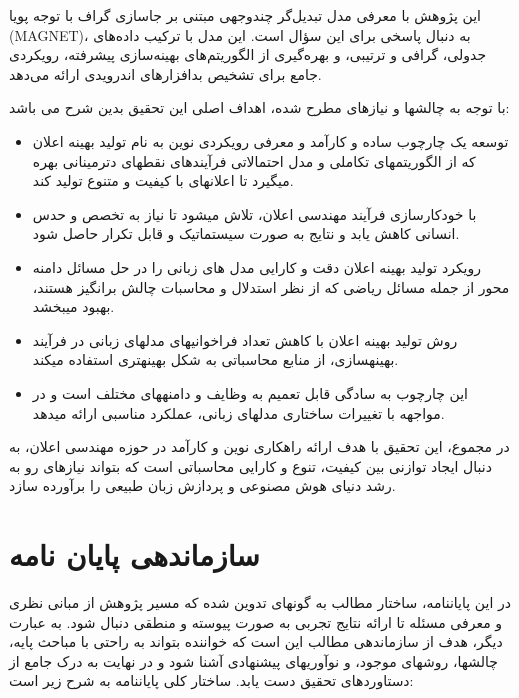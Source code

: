 این پژوهش با معرفی مدل تبدیل‌گر چندوجهی مبتنی بر جاسازی گراف با توجه پویا (MAGNET)، به دنبال پاسخی برای این سؤال است. این مدل با ترکیب داده‌های جدولی، گرافی و ترتیبی، و بهره‌گیری از الگوریتم‌های بهینه‌سازی پیشرفته، رویکردی جامع برای تشخیص بدافزارهای اندرویدی ارائه می‌دهد.

با توجه به چالش\/ها و نیازهای مطرح شده، اهداف اصلی این تحقیق بدین شرح می باشد:
\begin{itemize}
	\item توسعه یک چارچوب ساده و کارآمد و معرفی رویکردی نوین به نام تولید بهینه اعلان
	 که از الگوریتم\/های تکاملی و مدل احتمالاتی فرآیندهای نقطه\/ای دترمینانی بهره می\/گیرد تا اعلان\/های با کیفیت و متنوع تولید کند.
	\item با خودکارسازی فرآیند مهندسی اعلان، تلاش می\/شود تا نیاز به تخصص و حدس انسانی کاهش یابد و نتایج به صورت سیستماتیک و قابل تکرار حاصل شود.
	\item 
	رویکرد تولید بهینه اعلان دقت و کارایی مدل های زبانی را در حل مسائل دامنه محور از جمله مسائل ریاضی که از نظر استدلال و محاسبات چالش برانگیز هستند، بهبود می\/بخشد.
	\item 
	روش تولید بهینه اعلان با کاهش تعداد فراخوانی\/های مدل\/های زبانی در فرآیند بهینه\/سازی، از منابع محاسباتی به شکل بهینه\/تری استفاده می\/کند.
	\item  این چارچوب به سادگی قابل تعمیم به وظایف و دامنه\/های مختلف است و در مواجهه با تغییرات ساختاری مدل\/های زبانی، عملکرد مناسبی ارائه می\/دهد.
\end{itemize}

در مجموع، این تحقیق با هدف ارائه راهکاری نوین و کارآمد در حوزه مهندسی اعلان، به دنبال ایجاد توازنی بین کیفیت، تنوع و کارایی محاسباتی است که بتواند نیازهای رو به رشد دنیای هوش مصنوعی و پردازش زبان طبیعی را برآورده سازد.

\section{سازماندهی پایان نامه}\label{organiz}
در این پایان\/نامه، ساختار مطالب به گونه\/ای تدوین شده که مسیر پژوهش از مبانی نظری و معرفی مسئله تا ارائه نتایج تجربی به صورت پیوسته و منطقی دنبال شود. به عبارت دیگر، هدف از سازماندهی مطالب این است که خواننده بتواند به راحتی با مباحث پایه، چالش\/ها، روش\/های موجود، و نوآوری\/های پیشنهادی آشنا شود و در نهایت به درک جامع از دستاوردهای تحقیق دست یابد. ساختار کلی پایان\/نامه  به شرح زیر است:

